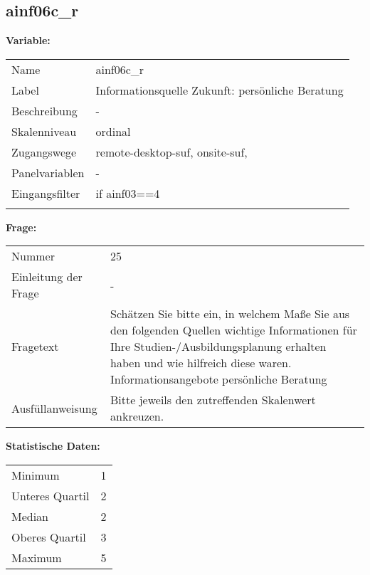 	
	
	\subsection{ainf06c\_r}
	\label{subSection:ainf06c_r}

	\noindent\textbf{Variable:}\\
		\begin{tabular}{lL{11.3cm}}
			\label{tableVariable:ainf06c_r}
			Name & ainf06c\_r \\
			Label & Informationsquelle Zukunft: persönliche Beratung \\
			Beschreibung & - \\
			Skalenniveau & ordinal \\
			Zugangswege &
				remote-desktop-suf,
				onsite-suf,
 \\
			Panelvariablen & -
			 \\
			Eingangsfilter & if ainf03==4 \\
 \\
		\end{tabular}

		\vspace*{1 cm}
		\noindent\textbf{Frage:}\\
		\begin{tabular}{lL{11.3cm}}
			\label{tableQuestion:ainf06c_r}
			Nummer & 25 \\
			Einleitung der Frage & - \\
			Fragetext & Schätzen Sie bitte ein, in welchem Maße Sie aus den folgenden Quellen wichtige Informationen für Ihre Studien-/Ausbildungsplanung erhalten haben und wie hilfreich diese waren.
Informationsangebote
persönliche Beratung \\
			Ausfüllanweisung & Bitte jeweils den zutreffenden Skalenwert ankreuzen. \\
		\end{tabular}


		\vspace*{1 cm}
		\noindent\textbf{Statistische Daten:}\\
			\begin{tabular}{ll}
				\label{tableStatistics:ainf06c_r}
					Minimum & 1 \\
					Unteres Quartil & 2 \\
					Median & 2 \\
					Oberes Quartil & 3 \\
					Maximum & 5 \\
			\end{tabular}



